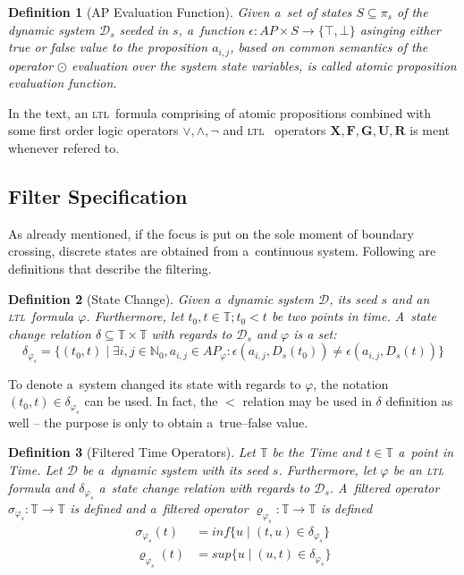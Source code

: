 \documentclass[12pt,oneside,draft]{fithesis}
\newcommand{\ltl}{\textsc{ltl}~}
\newcommand{\mD}{\mathcal{D}}
\newcommand{\mNatural}{\mathbb{N}}
\newcommand{\mTime}{\mathbb{T}}
\newcommand{\bF}{\mathbf{F}}
\newcommand{\bG}{\mathbf{G}}
\newcommand{\bX}{\mathbf{X}}
\newcommand{\bU}{\mathbf{U}}
\newcommand{\bR}{\mathbf{R}}
\newtheorem{mydef}{Definition}
\begin{document}
\begin{mydef}[AP Evaluation Function]
Given a~set of states $S\subseteq\pi_{s}$ of the dynamic system
$\mD_s$ seeded in $s$, a~function
$\epsilon:AP\times S\rightarrow\{\top,\bot\}$ asinging either true
or false value to the proposition $a_{i,j}$, based on common semantics
of the operator $\odot$ evaluation over the system state variables,
is called atomic proposition evaluation function.
\end{mydef}

In the text, an \ltl formula comprising of atomic propositions combined
with some first order logic operators $\vee,\wedge,\neg$ and \ltl
operators $\bX,\bF,\bG,\bU,\bR$ is ment whenever refered to.

\subsection{Filter Specification}
As already mentioned, if the focus is put on the sole moment of boundary
crossing, discrete states are obtained from a~continuous system.
Following are definitions that describe the filtering.
\begin{mydef}[State Change]
Given a~dynamic system $\mD$, its seed $s$ and an \ltl formula
$\varphi$. Furthermore, let $t_0,t\in\mTime;t_0<t$ be two points
in time. A~state change relation
$\delta\subseteq\mTime\times\mTime$ with regards to $\mD_s$
and $\varphi$ is a set:
	\begin{equation}
		\delta_{\varphi_s} = \{(t_0,t)\mid\exists i,j
			\in\mNatural_0,a_{i,j}\in
			AP_\varphi:\epsilon(a_{i,j},D_{s}(t_0))
			\neq\epsilon(a_{i,j},D_{s}(t))\}
	\end{equation}
\end{mydef}
To denote a~system changed its state with regards to $\varphi$, the
notation $(t_0,t)\in\delta_{\varphi_s}$ can be used.
In fact, the $<$ relation may be used in $\delta$ definition as well --
the purpose is only to obtain a~true--false value.

\begin{mydef}[Filtered Time Operators]
Let $\mTime$ be the Time and $t\in\mTime$ a~point in Time.
Let $\mD$ be a~dynamic system with its seed $s$.
Furthermore, let $\varphi$ be an \textsc{ltl} formula and
$\delta_{\varphi_s}$ a~state change relation with regards to $\mD_s$.
A~filtered operator $\sigma_{\varphi_s}:\mTime\rightarrow\mTime$
is defined and a~filtered operator
$\varrho_{\varphi_s}:\mTime\rightarrow\mTime$ is defined
	\begin{align}
		\sigma_{\varphi_s}(t)&=inf\{u\mid(t,u)\in\delta_{\varphi_s}\}\\
		\varrho_{\varphi_s}(t)&=sup\{u\mid(u,t)\in\delta_{\varphi_s}\}
	\end{align}
\end{mydef}
\end{document}
